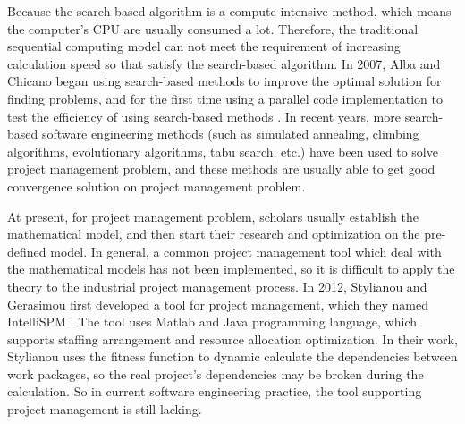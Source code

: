 Because the search-based algorithm is a compute-intensive method, which means
the computer's CPU are usually consumed a lot. Therefore, the traditional
sequential computing model can not meet the requirement of increasing
calculation speed so that satisfy the search-based algorithm. In 2007, Alba and
Chicano began using search-based methods to improve the optimal solution for
finding problems, and for the first time using a parallel code implementation to
test the efficiency of using search-based methods \cite{pospichal}.  In recent
years, more search-based software engineering methods (such as simulated
annealing, climbing algorithms, evolutionary algorithms, tabu search, etc.) have
been used to solve project management problem, and these methods are usually
able to get good convergence solution on project management problem.


At present, for project management problem, scholars usually establish the
mathematical model, and then start their research and optimization on the
pre-defined model. In general, a common project management tool which deal with
the mathematical models has not been implemented, so it is difficult to apply
the theory to the industrial project management process. In 2012, Stylianou and
Gerasimou first developed a tool for project management, which they named
IntelliSPM \cite{stylianou}. The tool uses Matlab and Java programming language,
which supports staffing arrangement and resource allocation optimization. In
their work, Stylianou uses the fitness function to dynamic calculate the
dependencies between work packages, so the real project's dependencies may be
broken during the calculation. So in current software engineering practice, the
tool supporting project management is still lacking.


